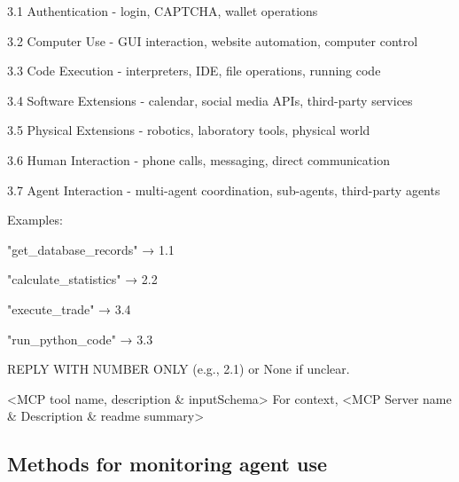 \documentclass[manuscript,screen,nonacm,oneside]{acmart}
\begin{document}
3.1 Authentication - login, CAPTCHA, wallet operations

3.2 Computer Use - GUI interaction, website automation, computer control

3.3 Code Execution - interpreters, IDE, file operations, running code

3.4 Software Extensions - calendar, social media APIs, third-party services

3.5 Physical Extensions - robotics, laboratory tools, physical world

3.6 Human Interaction - phone calls, messaging, direct communication

3.7 Agent Interaction - multi-agent coordination, sub-agents, third-party agents

Examples:

"get\_database\_records" → 1.1

"calculate\_statistics" → 2.2

"execute\_trade" → 3.4

"run\_python\_code" → 3.3

REPLY WITH NUMBER ONLY (e.g., 2.1) or \textquotesingle None\textquotesingle{} if unclear.

\textless MCP tool name, description \& inputSchema\textgreater{} For context, \textless MCP Server name \& Description \& readme summary\textgreater{}

\subsection{Methods for monitoring agent use}
\label{app:monitoring}
\end{document}

